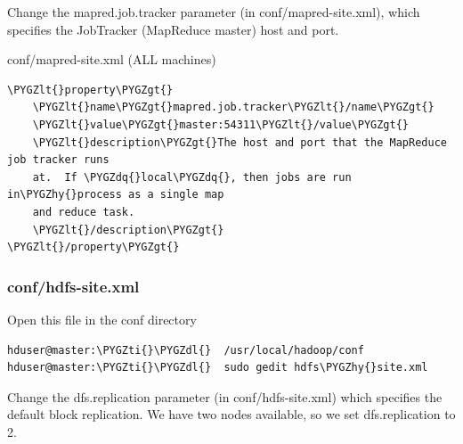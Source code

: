 \documentclass[a4paper,12pt,oneside]{sphinxmanual}
\def\PYGZlt{\char`\<}
\def\PYGZgt{\char`\>}
\def\PYGZdl{\char`\$}
\def\PYGZhy{\char`\-}
\def\PYGZdq{\char`\"}
\def\PYGZti{\char`\~}
\begin{document}
Change the mapred.job.tracker parameter (in conf/mapred-site.xml), which specifies the JobTracker (MapReduce master) host and port.

conf/mapred-site.xml (ALL machines)

\begin{Verbatim}[commandchars=\\\{\}]
\PYGZlt{}property\PYGZgt{}
    \PYGZlt{}name\PYGZgt{}mapred.job.tracker\PYGZlt{}/name\PYGZgt{}
    \PYGZlt{}value\PYGZgt{}master:54311\PYGZlt{}/value\PYGZgt{}
    \PYGZlt{}description\PYGZgt{}The host and port that the MapReduce job tracker runs
    at.  If \PYGZdq{}local\PYGZdq{}, then jobs are run in\PYGZhy{}process as a single map
    and reduce task.
    \PYGZlt{}/description\PYGZgt{}
\PYGZlt{}/property\PYGZgt{}
\end{Verbatim}
\begin{figure}[htbp]
\centering

\end{figure}


\subsubsection{conf/hdfs-site.xml}
\label{document:conf-hdfs-site-xml}
Open this file in the conf directory

\begin{Verbatim}[commandchars=\\\{\}]
hduser@master:\PYGZti{}\PYGZdl{}  /usr/local/hadoop/conf
hduser@master:\PYGZti{}\PYGZdl{}  sudo gedit hdfs\PYGZhy{}site.xml
\end{Verbatim}

Change the dfs.replication parameter (in conf/hdfs-site.xml) which specifies the default block replication.
We have two nodes available, so we set dfs.replication to 2.
\end{document}
